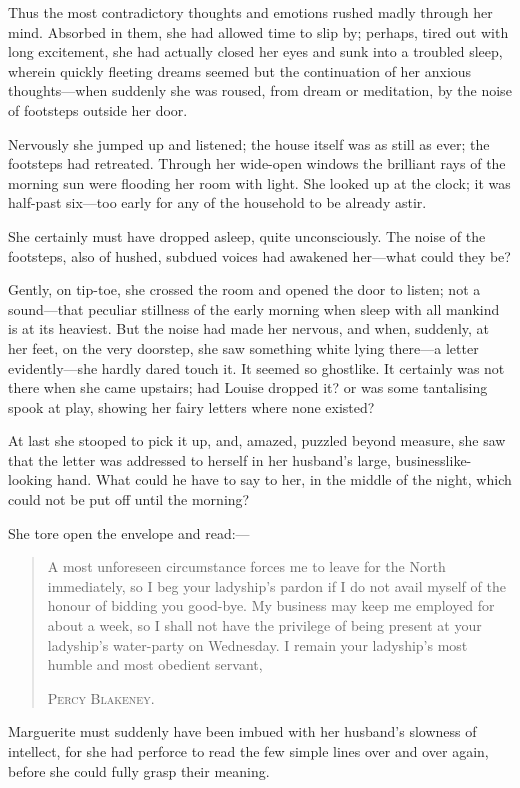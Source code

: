 \documentclass[paper=5.5in:8.5in,BCOR=7mm,twoside,DIV=calc,12pt,usegeometry,chapterprefix,endperiod,headings=big]{scrbook}
\begin{document}
Thus the most contradictory thoughts and emotions rushed madly through her mind. Absorbed in them, she had allowed time to slip by; perhaps, tired out with long excitement, she had actually closed her eyes and sunk into a troubled sleep, wherein quickly fleeting dreams seemed but the continuation of her anxious thoughts---when suddenly she was roused, from dream or meditation, by the noise of footsteps outside her door.

Nervously she jumped up and listened; the house itself was as still as ever; the footsteps had retreated. Through her wide-open windows the brilliant rays of the morning sun were flooding her room with light. She looked up at the clock; it was half-past six---too early for any of the household to be already astir.

She certainly must have dropped asleep, quite unconsciously. The noise of the footsteps, also of hushed, subdued voices had awakened her---what could they be?

Gently, on tip-toe, she crossed the room and opened the door to listen; not a sound---that peculiar stillness of the early morning when sleep with all mankind is at its heaviest. But the noise had made her nervous, and when, suddenly, at her feet, on the very doorstep, she saw something white lying there---a letter evidently---she hardly dared touch it. It seemed so ghostlike. It certainly was not there when she came upstairs; had Louise dropped it? or was some tantalising spook at play, showing her fairy letters where none existed?

At last she stooped to pick it up, and, amazed, puzzled beyond measure, she saw that the letter was addressed to herself in her husband's large, businesslike-looking hand. What could he have to say to her, in the middle of the night, which could not be put off until the morning?

She tore open the envelope and read:---
\blockquote{
A most unforeseen circumstance forces me to leave for the North immediately, so I beg your ladyship's pardon if I do not avail myself of the honour of bidding you good-bye. My business may keep me employed for about a week, so I shall not have the privilege of being present at your ladyship's water-party on Wednesday.
{\indent I remain your ladyship's most humble and most obedient servant,}\\
\begin{flushright}
\textsc{Percy Blakeney.}
\end{flushright}
}
Marguerite must suddenly have been imbued with her husband's slowness of intellect, for she had perforce to read the few simple lines over and over again, before she could fully grasp their meaning.
\end{document}
